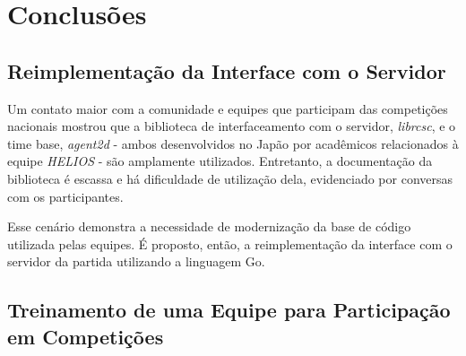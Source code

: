 
\chapter{Conclusões}

\label{CapConclusoes}


\section{Reimplementação da Interface com o Servidor}
\par Um contato maior com a comunidade e equipes que participam das competições nacionais mostrou que a biblioteca de interfaceamento com o servidor, \textit{librcsc}, e o time base, \textit{agent2d} - ambos desenvolvidos no Japão por acadêmicos relacionados à equipe \textit{HELIOS} - são amplamente utilizados. Entretanto, a documentação da biblioteca é escassa e há dificuldade de utilização dela, evidenciado por conversas com os participantes.
\par Esse cenário demonstra a necessidade de modernização da base de código utilizada pelas equipes.
É proposto, então, a reimplementação da interface com o servidor da partida utilizando a linguagem Go.

\section{Treinamento de uma Equipe para Participação em Competições}

 